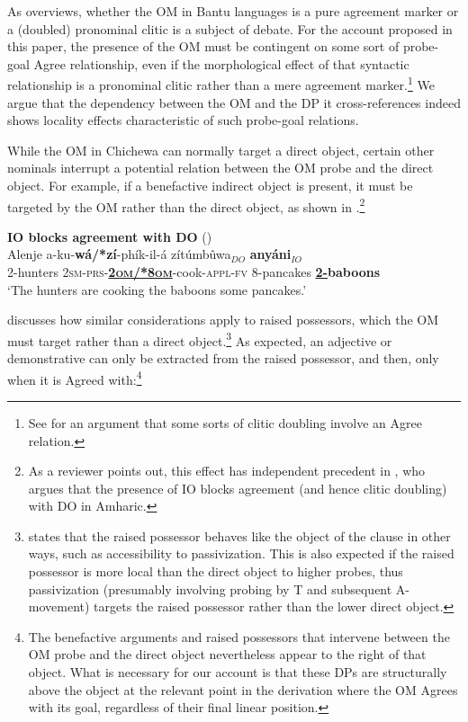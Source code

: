 \documentclass[output=paper,colorlinks,citecolor=brown]{langscibook}
\begin{document}
As \citet{Baker2016} overviews, whether the OM in Bantu languages is a pure agreement marker or a (doubled) pronominal clitic is a subject of debate. For the account proposed in this paper, the presence of the OM must be contingent on some sort of probe-goal Agree relationship, even if the morphological effect of that syntactic relationship is a pronominal clitic rather than a mere agreement marker.\footnote{See \citet{Preminger2015} for an argument that some sorts of clitic doubling involve an Agree relation.} We argue that the dependency between the OM and the DP it cross-references indeed shows locality effects characteristic of such probe-goal relations.

While the OM in Chichewa can normally target a direct object, certain other nominals interrupt a potential relation between the OM probe and the direct object. For example, if a benefactive indirect object is present, it must be targeted by the OM rather than the direct object, as shown in .\footnote{As a reviewer points out, this effect has independent precedent in \citet{Kramer2014}, who argues that the presence of IO blocks agreement (and hence clitic doubling) with DO in Amharic.}

\ea%
    \label{ex:branan:11}
    \textbf{IO blocks agreement with DO} \hfill{(\citealt[101, ex. 41a-b]{Mchombo2004})}\\
    \gll    Alenje a-ku-\textbf{wá/*zí}-phík-il-á zítúmbûwa$_{DO}$  \textbf{anyáni}$_{IO}$ \\
            2-hunters 2\textsc{sm-prs}-\underline{\textbf{\textsc{2om/*8om}}}-cook-\textsc{appl-fv} 8-pancakes \textbf{\underline{2-}baboons}  \\
    \glt    `The hunters are cooking the baboons some pancakes.'
\z

\citet{Mchombo2004} discusses how similar considerations apply to raised possessors, which the OM must target rather than a direct object.\footnote{\citeauthor{Mchombo2004} states that the raised possessor behaves like the object of the clause in other ways, such as accessibility to passivization. This is also expected if the raised possessor is more local than the direct object to higher probes, thus passivization (presumably involving probing by T and subsequent A-movement) targets the raised possessor rather than the lower direct object.} As expected, an adjective or demonstrative can only be extracted from the raised possessor, and then, only when it is Agreed with:\footnote{The benefactive arguments and raised possessors that intervene between the OM probe and the direct object nevertheless appear to the right of that object. What is necessary for our account is that these DPs are structurally above the object at the relevant point in the derivation where the OM Agrees with its goal, regardless of their final linear position.}
\end{document}
